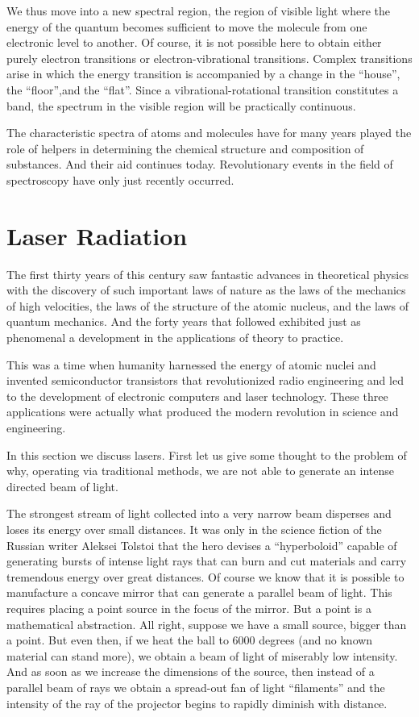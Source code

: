 We thus move into a new spectral region, the region of visible light where the energy of the quantum becomes sufficient to move the molecule from one electronic level to another. Of course, it is not possible here to obtain either purely electron transitions or electron-vibrational transitions. Complex transitions arise in which the energy transition is accompanied by a change in the ``house'', the ``floor'',and the ``flat''. Since a vibrational-rotational transition constitutes a band, the spectrum in the visible region will be practically continuous.

The characteristic spectra of atoms and molecules have for many years played the role of helpers in determining the chemical structure and composition of substances. And their aid continues today. Revolutionary events in the field of spectroscopy have only just recently occurred.

\section{Laser Radiation}

The first thirty years of this century saw fantastic advances in theoretical physics with the discovery of such important laws of nature as the laws of the mechanics of high velocities, the laws of the structure of the atomic nucleus, and the laws of quantum mechanics. And the forty years that followed exhibited just as phenomenal a development in the applications of theory to practice.

This was a time when humanity harnessed the energy of atomic nuclei and invented semiconductor transistors that revolutionized radio engineering and led to the development of electronic computers and laser technology. These three applications were actually what produced the modern revolution in science and engineering.

In this section we discuss lasers. First let us give some thought to the problem of why, operating via traditional methods, we are not able to generate an intense directed beam of light.

The strongest stream of light collected into a very narrow beam disperses and loses its energy over small distances. It was only in the science fiction of the Russian writer Aleksei Tolstoi that the hero devises a ``hyperboloid'' capable of generating bursts of intense light rays that can burn and cut materials and carry tremendous energy over great distances. Of course we know that it is possible to manufacture a concave mirror that can generate a parallel beam of light. This requires placing a point source in the focus of the mirror. But a point is a mathematical abstraction. All right, suppose we have a small source, bigger than a point. But even then, if we heat the ball to 6000 degrees (and no known material can stand more), we obtain a beam of light of miserably low intensity. And as soon as we increase the dimensions of the source, then instead of a parallel beam of rays we obtain a spread-out fan of light ``filaments'' and the intensity of the ray of the projector begins to rapidly diminish with distance.

